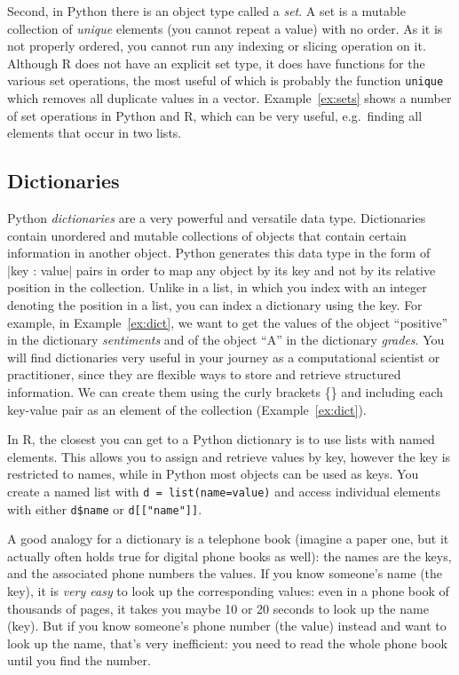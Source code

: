 Second, in Python there is an object type called a \emph{set}.
A set is a mutable collection of \emph{unique} elements (you cannot repeat a value) with
no order. As it is not properly ordered, you cannot run any indexing
or slicing operation on it.
Although R does not have an explicit set type,
it does have functions for the various set operations,
the most useful of which is probably the function \texttt{unique} which removes all duplicate values in a vector.
Example~\ref{ex:sets} shows a number of set operations in Python and R,
which can be very useful,  e.g.\ finding all elements that occur in two lists.


\subsection{Dictionaries}

Python \emph{dictionaries} are a very powerful and versatile data type.
Dictionaries contain unordered and mutable collections of objects that
contain certain information in another object. Python generates this
data type in the form of |{key : value}| pairs in order
to map any object by its key and not by its relative position in the
collection. Unlike in a list, in which you index with an integer denoting
the position in a list, you can index a dictionary using the key.
For example, in Example~\ref{ex:dict}, we want to get the values of the object ``positive'' in the
dictionary \emph{sentiments} and of the object ``A'' in the dictionary
\emph{grades}. You will
find dictionaries very useful in your journey as a computational
scientist or practitioner, since they are flexible ways to store and
retrieve structured information. We can create them using the curly
brackets \{\} and including each key-value pair as an element of the
collection (Example~\ref{ex:dict}).

In R, the closest you can get to a Python dictionary is to use lists with named elements.
This allows you to assign and retrieve values by key,
however the key is restricted to names, while in Python most objects can be used as keys.
You create a named list with \verb|d = list(name=value)| and access individual elements with either
\verb|d$name| or \verb|d[["name"]]|.


A good analogy for a dictionary is a telephone book (imagine a paper
one, but it actually often holds true for digital phone books as
well): the names are the keys, and the associated phone numbers the
values. If you know someone's name (the key), it is \emph{very easy}
to look up the corresponding values: even in a phone book of thousands
of pages, it takes you maybe 10 or 20 seconds to look up the name
(key). But if you know someone's phone number (the value) instead and
want to look up the name, that's very inefficient: you need to read
the whole phone book until you find the number.

